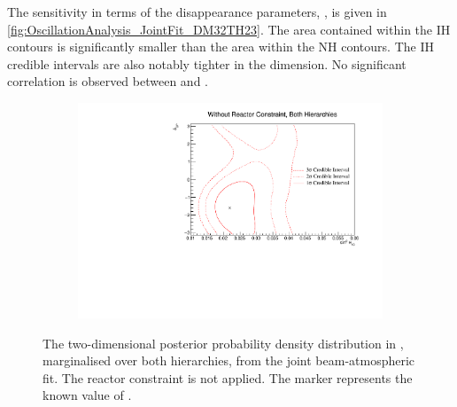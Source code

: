 The sensitivity in terms of the disappearance parameters, , is given in \autoref{fig:OscillationAnalysis_JointFit_DM32TH23}. The area contained within the IH contours is significantly smaller than the area within the NH contours. The IH credible intervals are also notably tighter in the  dimension. No significant correlation is observed between  and .

\begin{figure}[h]
  \begin{subfigure}[t]{0.95\textwidth}
    \includegraphics[width=\textwidth, trim={0mm 0mm 0mm 0mm}, clip,page=1]{Figures/OA/JointFit/Contours_2D_th13_dcp_BH_1_woRC_UnSmeared_CredibleInterval.pdf}
  \end{subfigure}
  \caption{The two-dimensional posterior probability density distribution in , marginalised over both hierarchies, from the joint beam-atmospheric fit. The reactor constraint is not applied. The marker represents the known value of .}
  \label{fig:OscillationAnalysis_JointFit_DCPTH13}
\end{figure}

